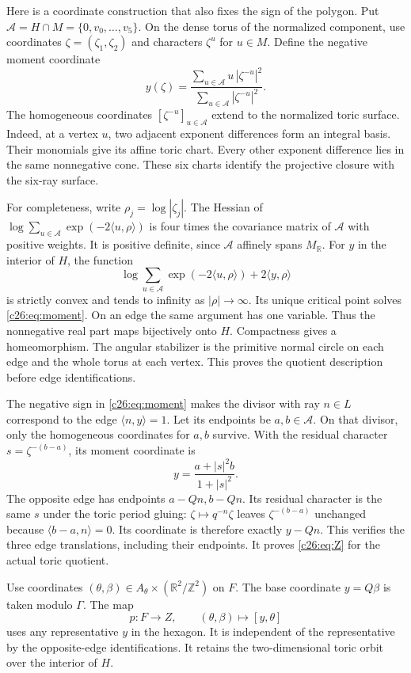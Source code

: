 Here is a coordinate construction that also fixes the sign of the polygon.
Put $\mathcal A=H\cap M=\{0,v_0,\ldots,v_5\}$.
On the dense torus of the normalized component, use coordinates
$\zeta=(\zeta_1,\zeta_2)$ and characters $\zeta^u$ for $u\in M$.
Define the negative moment coordinate
\begin{equation}\label{c26:eq:moment}
y(\zeta)=
\frac{\sum_{u\in\mathcal A}u\,|\zeta^{-u}|^2}
     {\sum_{u\in\mathcal A}|\zeta^{-u}|^2}.
\end{equation}
The homogeneous coordinates $[\zeta^{-u}]_{u\in\mathcal A}$ extend
to the normalized toric surface.
Indeed, at a vertex $u$, two adjacent exponent differences form an
integral basis. Their monomials give its affine toric chart.
Every other exponent difference lies in the same nonnegative cone.
These six charts identify the projective closure with the six-ray surface.

For completeness, write $\rho_j=\log|\zeta_j|$.
The Hessian of $\log\sum_{u\in\mathcal A}\exp(-2\langle u,\rho\rangle)$
is four times the covariance matrix of $\mathcal A$ with positive weights.
It is positive definite, since $\mathcal A$ affinely spans $M_\mathbb R$.
For $y$ in the interior of $H$, the function
\[
\log\sum_{u\in\mathcal A}\exp(-2\langle u,\rho\rangle)
       +2\langle y,\rho\rangle
\]
is strictly convex and tends to infinity as $|\rho|\to\infty$.
Its unique critical point solves \eqref{c26:eq:moment}.
On an edge the same argument has one variable.
Thus the nonnegative real part maps bijectively onto $H$.
Compactness gives a homeomorphism.
The angular stabilizer is the primitive normal circle on each edge
and the whole torus at each vertex.
This proves the quotient description before edge identifications.

The negative sign in \eqref{c26:eq:moment} makes the divisor with ray
$n\in L$ correspond to the edge $\langle n,y\rangle=1$.
Let its endpoints be $a,b\in\mathcal A$.
On that divisor, only the homogeneous coordinates for $a,b$ survive.
With the residual character $s=\zeta^{-(b-a)}$, its moment coordinate is
\[
y=\frac{a+|s|^2b}{1+|s|^2}.
\]
The opposite edge has endpoints $a-Qn,b-Qn$.
Its residual character is the same $s$ under the toric period gluing:
$\zeta\mapsto q^{-n}\zeta$ leaves $\zeta^{-(b-a)}$ unchanged because
$\langle b-a,n\rangle=0$.
Its coordinate is therefore exactly $y-Qn$.
This verifies the three edge translations, including their endpoints.
It proves \eqref{c26:eq:Z} for the actual toric quotient.

Use coordinates $(\theta,\beta)\in A_\theta\times(\mathbb R^2/\mathbb Z^2)$
on $F$. The base coordinate $y=Q\beta$ is taken modulo $\Gamma$.
The map
\begin{equation}\label{c26:eq:p}
p:F\longrightarrow Z,
\qquad (\theta,\beta)\longmapsto[y,\theta]
\end{equation}
uses any representative $y$ in the hexagon.
It is independent of the representative by the opposite-edge identifications.
It retains the two-dimensional toric orbit over the interior of $H$.

